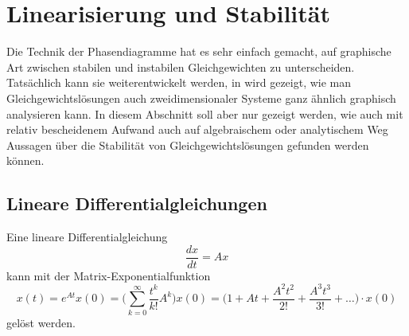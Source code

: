 %
%
%
\section{Linearisierung und Stabilität\label{section:linearisierung}}
Die Technik der Phasendiagramme hat es sehr einfach gemacht, auf graphische
Art zwischen stabilen und instabilen Gleichgewichten zu unterscheiden.
Tatsächlich kann sie weiterentwickelt werden, in \cite{skript:mathsem-dgl}
wird gezeigt, wie man Gleichgewichtslösungen auch zweidimensionaler
Systeme ganz ähnlich graphisch analysieren kann.
In diesem Abschnitt soll aber nur gezeigt werden, wie auch mit relativ
bescheidenem Aufwand auch auf algebraischem oder analytischem Weg
Aussagen über die Stabilität von Gleichgewichtslösungen gefunden werden
können.

\subsection{Lineare Differentialgleichungen}
Eine lineare Differentialgleichung
\begin{equation}
\frac{dx}{dt}
=
Ax
\label{skript:lin:dgl}
\end{equation}
kann mit der Matrix-Exponentialfunktion
\begin{equation}
x(t) = e^{At} x(0)
=
\biggl(
\sum_{k=0}^\infty \frac{t^k}{k!}A^k
\biggr) x(0)
=
\biggl(
1+ At + \frac{A^2t^2}{2!} +\frac{A^3t^3}{3!}+\dots
\biggl)\cdot x(0)
\label{skript:lin:potenzreihe}
\end{equation}
gelöst werden.

